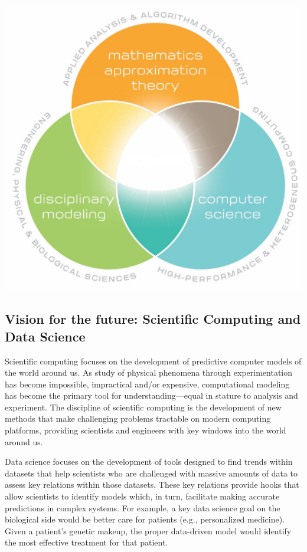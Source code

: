 \documentclass[%
oneside,                 %
final,                   %
10pt]{article}
\begin{document}
\vspace{6mm}

\centerline{\includegraphics[width=0.6\linewidth]{figslides/cs.jpg}}

\vspace{6mm}




\subsection{Vision for the future: Scientific Computing and Data Science}

Scientific computing focuses on the development of predictive computer
models of the world around us. As study of physical phenomena through
experimentation has become impossible, impractical and/or expensive,
computational modeling has become the primary tool for
understanding—equal in stature to analysis and experiment. 
The discipline of scientific computing
is the development of new methods that make challenging problems
tractable on modern computing platforms, providing scientists and
engineers with key windows into the world around us.

Data science focuses on the development of tools designed to find
trends within datasets that help scientists who are challenged with
massive amounts of data to assess key relations within those
datasets. These key relations provide hooks that allow scientists to
identify models which, in turn, facilitate making accurate predictions
in complex systems. For example, a key data science goal on the
biological side would be better care for patients (e.g., personalized
medicine). Given a patient’s genetic makeup, the proper data-driven
model would identify the most effective treatment for that patient.
\end{document}

